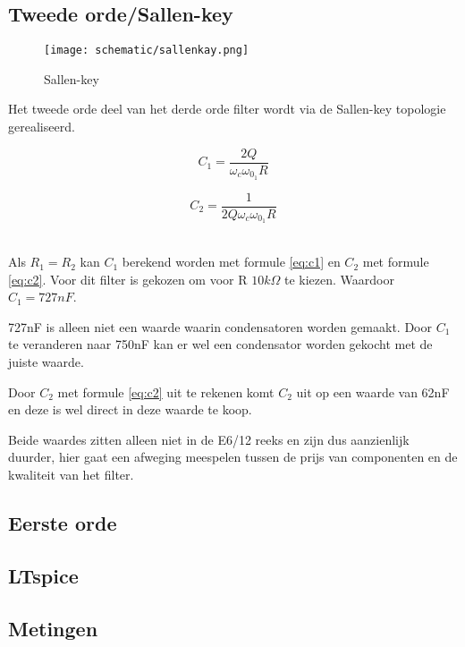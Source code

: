 \subsection{Tweede orde/Sallen-key}
\begin{wrapfigure}{l}{0.25 \textwidth}
	\texttt{[image: schematic/sallenkay.png]}
	\caption{Sallen-key}
\end{wrapfigure}
Het tweede orde deel van het derde orde filter wordt via de Sallen-key topologie gerealiseerd.
\vphantom{-}\\
\begin{minipage}{0.37\textwidth}
	\begin{equation} \label{eq:c1}
		C_1=\frac{2Q}{\omega_c\omega_{0_1}R}
	\end{equation}
\end{minipage}
\hfill
\begin{minipage}{0.37\textwidth}
	\begin{equation} \label{eq:c2}
		C_2=\frac{1}{2Q\omega_c\omega_{0_1}R}
	\end{equation}
\end{minipage}
\vphantom{-}\\

\noindent
Als $R_1 = R_2$ kan $C_1$ berekend worden met formule \ref{eq:c1} en $C_2$ met formule \ref{eq:c2}.
Voor dit filter is gekozen om voor R $10k\Omega$ te kiezen. Waardoor $C_1=727nF$.

\noindent
727nF is alleen niet een waarde waarin condensatoren worden gemaakt. Door $C_1$ te veranderen naar 750nF 
kan er wel een condensator worden gekocht met de juiste waarde. 

\noindent
Door $C_2$ met formule \ref{eq:c2} uit te rekenen komt $C_2$ uit op een waarde van 62nF en deze is wel direct 
in deze waarde te koop. 

\noindent
Beide waardes zitten alleen niet in de E6/12 reeks en zijn dus aanzienlijk duurder, 
hier gaat een afweging meespelen tussen de prijs van componenten en de kwaliteit van het filter.

\subsection{Eerste orde}

\subsection{LTspice}

\subsection{Metingen}
